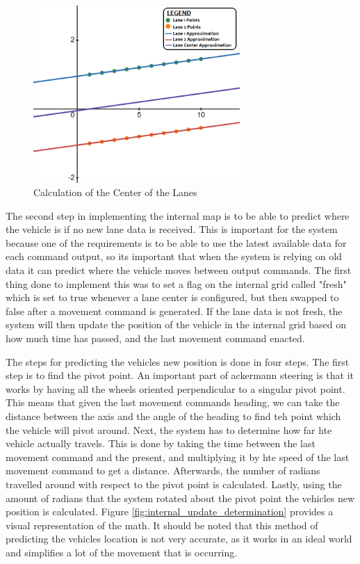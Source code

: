 \documentclass[titlepage,draft]{article}
\begin{document}
{\begin{figure}
	\centering
	\includegraphics[width=0.7\textwidth]{lane_center}
	\caption{Calculation of the Center of the Lanes}
	\label{fig:lane_center_determination}
\end{figure}

The second step in implementing the internal map is to be able to predict where the vehicle is if no new lane data is received. This is important for the system because one of the requirements is to be able to use the latest available data for each command output, so its important that when the system is relying on old data it can predict where the vehicle moves between output commands. The first thing done to implement this was to set a flag on the internal grid called "fresh" which is set to true whenever a lane center is configured, but then swapped to false after a movement command is generated. If the lane data is not fresh, the system will then update the position of the vehicle in the internal grid based on how much time has passed, and the last movement command enacted.

The steps for predicting the vehicles new position is done in four steps. The first step is to find the pivot point. An important part of ackermann steering is that it works by having all the wheels oriented perpendicular to a singular pivot point. This means that given the last movement commands heading, we can take the distance between the axis and the angle of the heading to find teh point which the vehicle will pivot around. Next, the system has to determine how far hte vehicle actually travels. This is done by taking the time between the last movement command and the present, and multiplying it by hte speed of the last movement command to get a distance. Afterwards, the number of radians travelled around with respect to the pivot point is calculated. Lastly, using the amount of radians that the system rotated about the pivot point the vehicles new position is calculated. Figure \ref{fig:internal_update_determination} provides a visual representation of the math. It should be noted that this method of predicting the vehicles location is not very accurate, as it works in an ideal world and simplifies a lot of the movement that is occurring.

}
\end{document}
